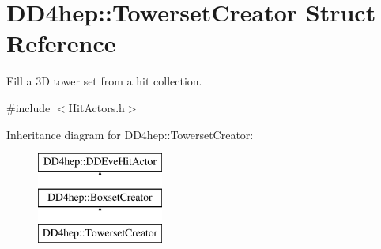 \hypertarget{struct_d_d4hep_1_1_towerset_creator}{}\section{D\+D4hep\+:\+:Towerset\+Creator Struct Reference}
\label{struct_d_d4hep_1_1_towerset_creator}


Fill a 3D tower set from a hit collection.  




{\ttfamily \#include $<$Hit\+Actors.\+h$>$}

Inheritance diagram for D\+D4hep\+:\+:Towerset\+Creator\+:\begin{figure}[H]
\begin{center}
\leavevmode
\includegraphics[height=3.000000cm]{struct_d_d4hep_1_1_towerset_creator}
\end{center}
\end{figure}
